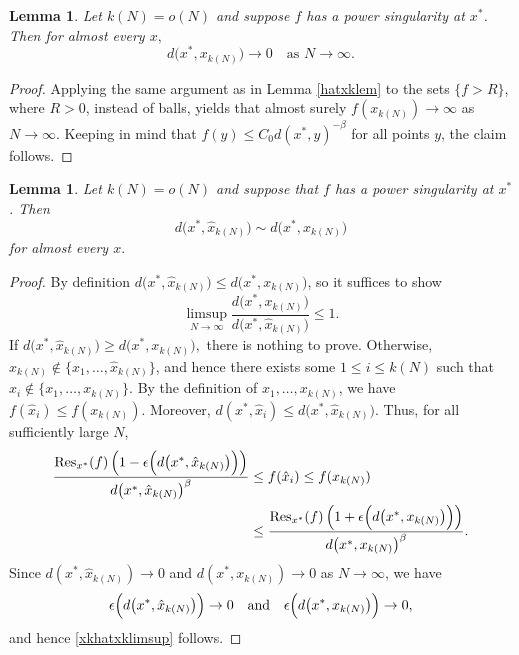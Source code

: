 \documentclass[11pt,twoside,a4paper,reqno]{amsart}
\newtheorem{lemma}[theorem]{Lemma}
\newcommand{\Res}{\operatorname{Res}}
\newcommand{\as}[1]{\text{as } #1 \rightarrow\infty}
\begin{document}
\begin{lemma}\label{xklem}
Let $k(N)=o(N)$ and suppose $f$ has a power singularity at $x^*$. Then for almost every $x,$
\begin{equation}\label{mdsay}
d\bigl(x^*,x_{k(N)}\bigr) \rightarrow 0 \quad \as{N}.
\end{equation}
\end{lemma}
\begin{proof}
Applying the same argument as in Lemma \ref{hatxklem} to the sets $\{f>R\}$, where $R>0$, instead of balls, yields that almost surely $f(x_{k(N)})\rightarrow\infty$ as $N\rightarrow\infty$. Keeping in mind that $f(y) \leq C_0 d(x^*,y)^{-\beta}$ for all points $y$, the claim follows.
\end{proof}




\begin{lemma}\label{xkhatxklem}
Let $k(N)=o(N)$ and suppose that $f$ has a power singularity at $x^*$. Then
\begin{equation*}
d\bigl(x^*,\hat{x}_{k(N)}\bigr) \sim d\bigl(x^*,x_{k(N)}\bigr)
\end{equation*}
for almost every $x.$
\end{lemma}
\begin{proof}
By definition $d\bigl(x^*,\hat{x}_{k(N)}\bigr) \leq d\bigl(x^*,x_{k(N)}\bigr)$, so it suffices to show
\begin{equation}\label{xkhatxklimsup}
\limsup_{N\rightarrow\infty} \frac{d\bigl(x^*,x_{k(N)}\bigr)}{d\bigl(x^*,\hat{x}_{k(N)}\bigr)} \leq 1.
\end{equation}
If $d\bigl(x^*,\hat{x}_{k(N)}\bigr)\ge d\bigl(x^*,x_{k(N)}\bigr),$
there is nothing to prove. Otherwise, $x_{k(N)}\notin\{\hat{x}_1,\ldots,\hat{x}_{k(N)}\}$, and hence
there exists some $1\leq i\leq k(N)$ such that $\hat{x}_i\notin\{x_1,\ldots,x_{k(N)}\}.$ By the definition of $x_1,\ldots,x_{k(N)}$, we have $f(\hat{x}_i)\leq f(x_{k(N)}).$ Moreover, $d(x^*,\hat{x}_i)\leq d\bigl(x^*,\hat{x}_{k(N)}\bigr).$
Thus, for all sufficiently large $N$,
\begin{align*}
\frac{\Res_{x^*}(f)\left(1-\epsilon\Bigl(d\bigl(x^*,\hat{x}_{k(N)}\bigr)\Bigr)\right)}{ d\bigl(x^*,\hat{x}_{k(N)}\bigr)^\beta}&\leq
f(\hat{x}_i) \leq f(x_{k(N)})\\
&\leq \frac{\Res_{x^*}(f)\left(1+\epsilon\Bigl(d\bigl(x^*,x_{k(N)}\bigr)\Bigr)\right)}{ d\bigl(x^*,x_{k(N)}\bigr)^\beta }.
\end{align*}
Since $d(x^*,\hat{x}_{k(N)})\to0$ and $d(x^*,x_{k(N)})\to0$ as $N\to\infty$, we have
\begin{equation*}
\epsilon\Bigl(d\bigl(x^*,\hat{x}_{k(N)}\bigr)\Bigr)\to0
\quad\text{and}\quad
\epsilon\Bigl(d\bigl(x^*,x_{k(N)}\bigr)\Bigr)\to0,
\end{equation*}
and hence \eqref{xkhatxklimsup} follows.
\end{proof}
\end{document}
